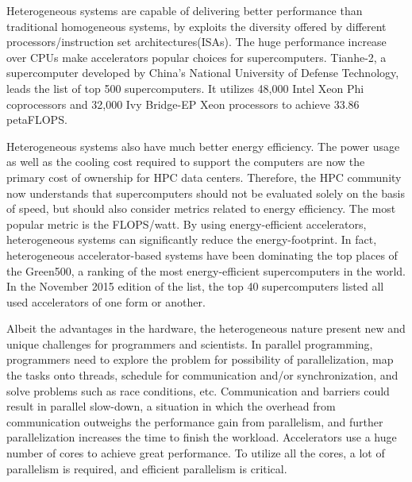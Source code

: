 

Heterogeneous systems are capable of delivering better performance than 
traditional homogeneous systems, by exploits the diversity offered by different 
processors/instruction set architectures(ISAs). 
The huge performance increase over CPUs make accelerators popular choices for
supercomputers. Tianhe-2, a supercomputer developed by China’s National 
University of Defense Technology, leads the list of top 500 supercomputers.
It utilizes 48,000  Intel Xeon Phi coprocessors and 32,000 Ivy Bridge-EP Xeon 
processors to achieve 33.86 petaFLOPS.

Heterogeneous systems also have much better energy efficiency. 
The power usage as well as the cooling cost required to support the computers
are now the primary cost of ownership for HPC data centers. Therefore,
the HPC community now understands that supercomputers should not be evaluated
solely on the basis of speed, but should also consider metrics related to 
energy efficiency. The most popular metric is the FLOPS/watt.
By using energy-efficient accelerators,
heterogeneous systems can significantly reduce the energy-footprint. 
In fact, heterogeneous accelerator-based systems have been dominating the 
top places of the Green500, %
a ranking of the most energy-efficient supercomputers in the world. 
In the November 2015 edition of the list, 
the top 40 supercomputers listed all used accelerators of one form or another.

Albeit the advantages in the hardware, the heterogeneous nature present new
and unique challenges for programmers and scientists. 
In parallel programming, programmers need to explore the problem for 
possibility of parallelization, map the tasks onto threads, schedule for
communication and/or synchronization, and solve problems such as race conditions,
etc. Communication and barriers could result in parallel slow-down, 
a situation in which the overhead from communication outweighs the performance 
gain from parallelism, and further parallelization increases the time to finish
the workload. 
Accelerators use a huge number of cores to achieve great performance. 
To utilize all the cores, a lot of parallelism is required, and efficient 
parallelism is critical. 

